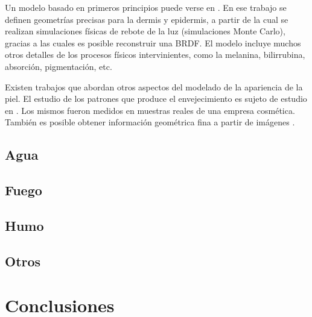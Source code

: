 Un modelo basado en primeros principios puede verse en \cite{Krishnaswamy2004}.
En ese trabajo se definen geometrías precisas para la dermis y epidermis, a partir de la cual se realizan simulaciones físicas de rebote de la luz (simulaciones Monte Carlo), gracias a las cuales es posible reconstruir una BRDF.
El modelo incluye muchos otros detalles de los procesos físicos intervinientes, como la melanina, bilirrubina, absorción, pigmentación, etc.

Existen trabajos que abordan otros aspectos del modelado de la apariencia de la piel.
El estudio de los patrones que produce el envejecimiento es sujeto de estudio en \cite{Boissieux2000}.
Los mismos fueron medidos en muestras reales de una empresa cosmética.
También es posible obtener información geométrica fina a partir de imágenes \cite{Golovinskiy2006}.

\subsection{Agua}
\subsection{Fuego}
\subsection{Humo}

\subsection{Otros}


\section{Conclusiones}

